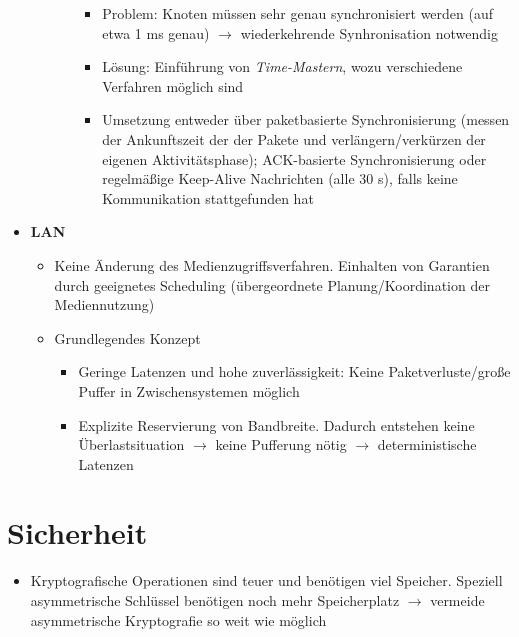 \begin{itemize}
\begin{itemize}
\begin{itemize}
			\begin{itemize}
				\item Problem: Knoten müssen sehr genau synchronisiert werden (auf etwa 1 ms genau) \(\rightarrow\) wiederkehrende Synhronisation notwendig
				\item Lösung: Einführung von \textit{Time-Mastern}, wozu verschiedene Verfahren möglich sind
				\item Umsetzung entweder über paketbasierte Synchronisierung (messen der Ankunftszeit der der Pakete und verlängern/verkürzen der eigenen Aktivitätsphase); ACK-basierte Synchronisierung oder regelmäßige Keep-Alive Nachrichten (alle 30 s), falls keine Kommunikation stattgefunden hat
			\end{itemize}
		\end{itemize}
	\end{itemize}
	\item \textbf{LAN}
	\begin{itemize}
		\item Keine Änderung des Medienzugriffsverfahren. Einhalten von Garantien durch geeignetes Scheduling (übergeordnete Planung/Koordination der Mediennutzung)
		\item Grundlegendes Konzept
		\begin{itemize}
			\item Geringe Latenzen und hohe zuverlässigkeit: Keine Paketverluste/große Puffer in Zwischensystemen möglich
			\item Explizite Reservierung von Bandbreite. Dadurch entstehen keine Überlastsituation \(\rightarrow\) keine Pufferung nötig \(\rightarrow\) deterministische Latenzen
		\end{itemize}
	\end{itemize}
\end{itemize}


\section{Sicherheit}
\begin{itemize}
	\item Kryptografische Operationen sind teuer und benötigen viel Speicher. Speziell asymmetrische Schlüssel benötigen noch mehr Speicherplatz \(\rightarrow\) vermeide asymmetrische Kryptografie so weit wie möglich
\end{itemize}

